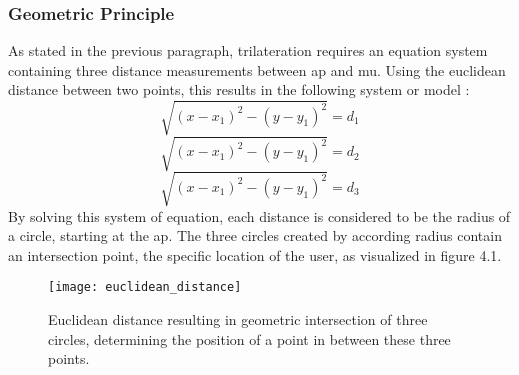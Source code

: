 \subsubsection{Geometric Principle}
As stated in the previous paragraph, trilateration requires an equation system containing three distance measurements between \acrshort{ap} and \acrlong{mu}. Using the euclidean distance between two points, this results in the following system or model \cite{CutTheKnot}:
\[ \sqrt{(x-x_1)^2 - (y-y_1)^2} = d_1 \]
\[ \sqrt{(x-x_1)^2 - (y-y_1)^2} = d_2 \]
\[ \sqrt{(x-x_1)^2 - (y-y_1)^2} = d_3 \]
By solving this system of equation, each distance is considered to be the radius of a circle, starting at the \acrshort{ap}. The three circles created by according radius contain an intersection point, the specific location of the user, as visualized in figure 4.1.
\begin{figure}[h!]
\centering
\texttt{[image: euclidean\_distance]}
\caption{Euclidean distance resulting in geometric intersection of three circles, determining the position of a point in between these three points.}
\label{fig:euclidean}
\end{figure}
